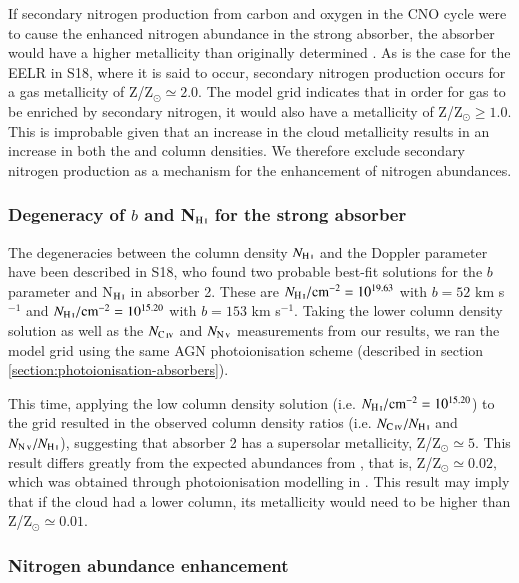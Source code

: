 If secondary nitrogen production from carbon and oxygen in the CNO cycle were to cause the enhanced nitrogen abundance in the strong absorber, the absorber would have a higher metallicity than originally determined \citep[Z/Z$_\odot \simeq 0.02$;][]{binette2000,binette2006}. As is the case for the EELR in S18, where it is said to occur, secondary nitrogen production occurs for a gas metallicity of Z/Z$_\odot \simeq 2.0.$ The  model grid indicates that in order for gas to be enriched by secondary nitrogen, it would also have a metallicity of Z/Z$_\odot \geq 1.0.$ This is improbable given that an increase in the cloud metallicity results in an increase in both the  and  column densities. We therefore exclude secondary nitrogen production as a mechanism for the enhancement of nitrogen abundances. 

\subsubsection{Degeneracy of $b$ and N$_\ion{H}{I}$ for the strong absorber}

The degeneracies between the  column density $N_\ion{H}{I}$ and the Doppler parameter have been described in S18, who found two probable best-fit solutions for the $b$ parameter and N$_\ion{H}{I}$ in absorber 2. These are $N_\ion{H}{I}/{\rm cm}^{-2} = 10^{19.63}$ with $b = 52$ km s$^{-1}$ and $N_\ion{H}{I}/{\rm cm}^{-2} = 10^{15.20}$ with $b = 153$ km s$^{-1}.$ Taking the lower  column density solution as well as the $N_\ion{C}{IV}$ and $N_\ion{N}{V}$ measurements from our results, we ran the  model grid using the same AGN photoionisation scheme (described in section \ref{section:photoionisation-absorbers}).

This time, applying the low  column density solution (i.e. $N_\ion{H}{I}/{\rm cm}^{-2} = 10^{15.20}$) to the grid resulted in the observed column density ratios (i.e. $N_\ion{C}{IV}/N_\ion{H}{I}$ and $N_\ion{N}{V}/N_\ion{H}{I}$), suggesting that absorber 2 has a supersolar metallicity, Z/Z$_\odot \simeq 5.$ This result differs greatly from the expected abundances from \citet{binette2000}, that is, Z/Z$_\odot \simeq 0.02,$ which was obtained through photoionisation modelling in  \citep{binette1985,ferruit1997}. This result may imply that if the cloud had a lower  column, its metallicity would need to be higher than Z/Z$_\odot \simeq 0.01.$ 

\subsubsection{Nitrogen abundance enhancement}

